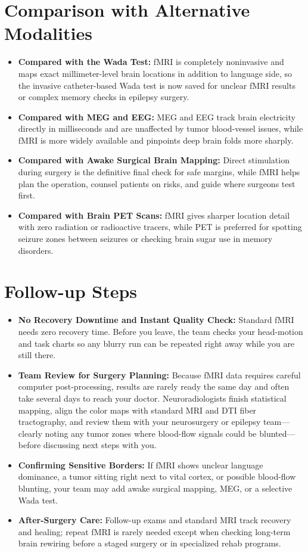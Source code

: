 \section{Comparison with Alternative Modalities}

\begin{itemize}
    \item \textbf{Compared with the Wada Test:} fMRI is completely noninvasive and maps exact millimeter-level brain locations in addition to language side, so the invasive catheter-based Wada test is now saved for unclear fMRI results or complex memory checks in epilepsy surgery.
    \item \textbf{Compared with MEG and EEG:} MEG and EEG track brain electricity directly in milliseconds and are unaffected by tumor blood-vessel issues, while fMRI is more widely available and pinpoints deep brain folds more sharply.
    \item \textbf{Compared with Awake Surgical Brain Mapping:} Direct stimulation during surgery is the definitive final check for safe margins, while fMRI helps plan the operation, counsel patients on risks, and guide where surgeons test first.
    \item \textbf{Compared with Brain PET Scans:} fMRI gives sharper location detail with zero radiation or radioactive tracers, while PET is preferred for spotting seizure zones between seizures or checking brain sugar use in memory disorders.
\end{itemize}

\section{Follow-up Steps}

\begin{itemize}
    \item \textbf{No Recovery Downtime and Instant Quality Check:} Standard fMRI needs zero recovery time. Before you leave, the team checks your head-motion and task charts so any blurry run can be repeated right away while you are still there.
    \item \textbf{Team Review for Surgery Planning:} Because fMRI data requires careful computer post-processing, results are rarely ready the same day and often take several days to reach your doctor. Neuroradiologists finish statistical mapping, align the color maps with standard MRI and DTI fiber tractography, and review them with your neurosurgery or epilepsy team---clearly noting any tumor zones where blood-flow signals could be blunted---before discussing next steps with you.
    \item \textbf{Confirming Sensitive Borders:} If fMRI shows unclear language dominance, a tumor sitting right next to vital cortex, or possible blood-flow blunting, your team may add awake surgical mapping, MEG, or a selective Wada test.
    \item \textbf{After-Surgery Care:} Follow-up exams and standard MRI track recovery and healing; repeat fMRI is rarely needed except when checking long-term brain rewiring before a staged surgery or in specialized rehab programs.
\end{itemize}

